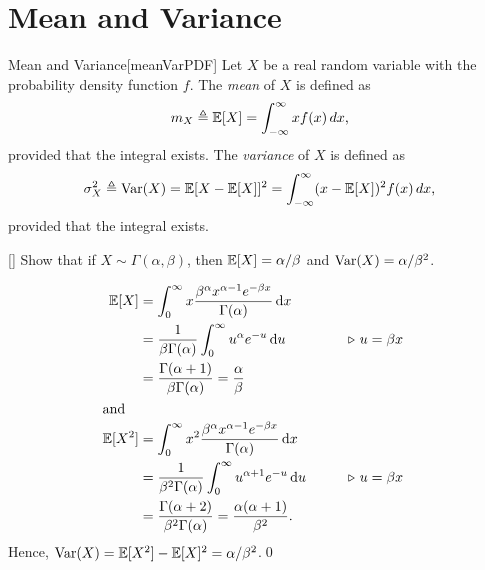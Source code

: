 \documentclass[../probability.tex]{subfiles}
\begin{document}
\section{Mean and Variance}

\begin{Definition}{Mean and Variance}[meanVarPDF]
    Let \(X\) be a real random variable with the probability density function \(f\).
    The \emph{mean} of \(X\) is defined as
    \[
        m_X \triangleq \mathbb{E}[X] = \int_{-\infty}^{\infty} x f(x) \,dx\text,
    \]
    provided that the integral exists.
    The \emph{variance} of \(X\) is defined as
    \[
        \sigma_X^2 \triangleq \operatorname{Var}(X) = \mathbb{E}[X - \mathbb{E}[X]]^2 = \int_{-\infty}^{\infty} (x -
        \mathbb{E}[X])^2 f(x) \,dx\text,
    \]
    provided that the integral exists.
\end{Definition}

\begin{Exercise}{}[]
    Show that if \(X \sim \Gamma(\alpha, \beta)\), then \(\mathbb{E}[X] = \alpha/\beta\)
    and \(\operatorname{Var}(X) = \alpha/\beta^2\).
\end{Exercise}
\begin{solution}
    \begin{alignat*}{2}
        \mbb{E}[X]
        &= \int_0^\infty x \frac{\beta^\alpha x^{\alpha-1} e^{-\beta x}}{\Gamma(\alpha)} \d x &\qquad \\
        &= \frac{1}{\beta \Gamma(\alpha)} \int_0^\infty u^\alpha e^{-u} \d u
        && \comment{\(u = \beta x\)} \\
        &= \frac{\Gamma(\alpha+1)}{\beta \Gamma(\alpha)} = \frac{\alpha}{\beta} \\
        \shortintertext{and}
        \mbb{E}[X^2]
        &= \int_0^\infty x^2 \frac{\beta^\alpha x^{\alpha-1} e^{-\beta x}}{\Gamma(\alpha)} \d x \\
        &= \frac{1}{\beta^2\Gamma(\alpha)}\int_0^\infty u^{\alpha+1}e^{-u} \d u
        && \comment{\(u = \beta x\)} \\
        &= \frac{\Gamma(\alpha+2)}{\beta^2\Gamma(\alpha)} = \frac{\alpha(\alpha+1)}{\beta^2}\text.
    \end{alignat*}
    Hence, \(\operatorname{Var}(X) = \mathbb{E}[X^2] - \mathbb{E}[X]^2 = \alpha/\beta^2\).\qed
\end{solution}
\end{document}

